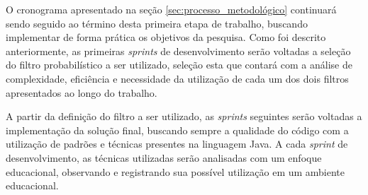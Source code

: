 O cronograma apresentado na seção \ref{sec:processo_metodológico} continuará sendo seguido ao término desta primeira etapa de trabalho, buscando implementar de forma prática os objetivos da pesquisa. Como foi descrito anteriormente, as primeiras \textit{sprints} de desenvolvimento serão voltadas a seleção do filtro probabilístico a ser utilizado, seleção esta que contará com a análise de complexidade, eficiência e necessidade da utilização de cada um dos dois filtros apresentados ao longo do trabalho.

A partir da definição do filtro a ser utilizado, as \textit{sprints} seguintes serão voltadas a implementação da solução final, buscando sempre a qualidade do código com a utilização de padrões e técnicas presentes na linguagem Java. A cada \textit{sprint} de desenvolvimento, as técnicas utilizadas serão analisadas com um enfoque educacional, observando e registrando sua possível utilização em um ambiente educacional.

